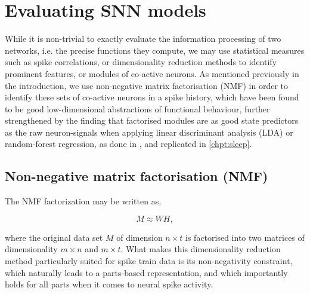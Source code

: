 \documentclass[mphil,deptreport,ianc]{infthesis} %
\begin{document}
\section{Evaluating SNN models}


While it is non-trivial to exactly evaluate the information processing of two networks, i.e. the precise functions they compute, we may use statistical measures such as spike correlations, or dimensionality reduction methods to identify prominent features, or modules of co-active neurons.
As mentioned previously in the introduction, we use non-negative matrix factorisation (NMF) \cite{Seung1999, Seung2001} in order to identify these sets of co-active neurons in a spike history, which have been found to be good low-dimensional abstractions of functional behaviour, further strengthened by the finding that factorised modules are as good state predictors as the raw neuron-signals when applying linear discriminant analysis (LDA) or random-forest regression, as done in \cite{Onken2016a}, and replicated in \ref{chpt:sleep}.

\subsection{Non-negative matrix factorisation (NMF)}

The NMF factorization may be written as,

\begin{equation}
    M \approx WH,
\end{equation}

where the original data set $M$ of dimension $n \times t$ is factorised into two matrices of dimensionality $m \times n$ and $m \times t$.
What makes this dimensionality reduction method particularly suited for spike train data is its non-negativity constraint, which naturally leads to a parts-based representation, and which importantly holds for all parts when it comes to neural spike activity.
\end{document}
